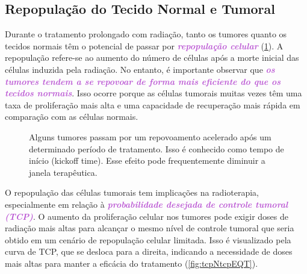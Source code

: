 \documentclass[11pt,a4paper]{article}
\begin{document}
\subsection*{Repopulação do Tecido Normal e Tumoral}

	Durante o tratamento prolongado com radiação, tanto os tumores quanto os tecidos normais têm o potencial de passar por \textcolor{MediumOrchid}{\textbf{\textit{repopulação celular}}} (\ref{fig:repopulacaoAcelerada}). A repopulação refere-se ao aumento do número de células após a morte inicial das células induzida pela radiação. No entanto, é importante observar que \textcolor{MediumOrchid}{\textbf{\textit{os tumores tendem a se repovoar de forma mais eficiente do que os tecidos normais}}}. Isso ocorre porque as células tumorais muitas vezes têm uma taxa de proliferação mais alta e uma capacidade de recuperação mais rápida em comparação com as células normais.

	\begin{figure}[h]
		\centering
		\caption{Alguns tumores passam por um repovoamento acelerado após um determinado período de tratamento. Isso é conhecido como tempo de início (kickoff time). Esse efeito pode frequentemente diminuir a janela terapêutica.}
		\label{fig:repopulacaoAcelerada}
	\end{figure}

	O repopulação das células tumorais tem implicações na radioterapia, especialmente em relação à \textcolor{MediumOrchid}{\textbf{\textit{probabilidade desejada de controle tumoral (TCP)}}}. O aumento da proliferação celular nos tumores pode exigir doses de radiação mais altas para alcançar o mesmo nível de controle tumoral que seria obtido em um cenário de repopulação celular limitada. Isso é visualizado pela curva de TCP, que se desloca para a direita, indicando a necessidade de doses mais altas para manter a eficácia do tratamento (\ref{fig:tcpNtcpEQT}).
\end{document}
